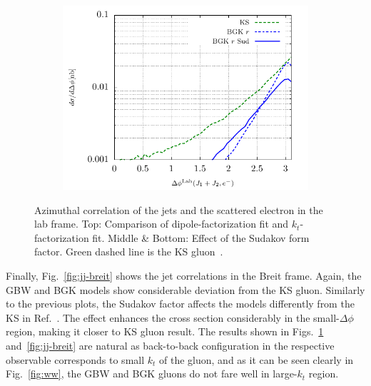 \documentclass[11pt]{article}
\numberwithin{equation}{section}
\numberwithin{table}{section}
\numberwithin{figure}{section}
\begin{document}
\begin{figure}[p]
\begin{subfigure}{0.5\textwidth}
		\includegraphics[width=\textwidth]{plots/plotBGK3Lab}
	\end{subfigure}
\caption{\footnotesize Azimuthal correlation of the jets and the scattered electron in the lab frame. Top: Comparison of dipole-factorization fit and $k_t$-factorization fit. Middle \& Bottom: Effect of the Sudakov form factor.  Green dashed line is the KS gluon~\cite{vanHameren:2021sqc}.}
\label{fig:je-lab}
\end{figure}

Finally, Fig.~\ref{fig:jj-breit} shows the jet correlations in the Breit frame. Again, the GBW and BGK models show considerable deviation from the KS gluon. Similarly to the previous plots, the Sudakov factor affects the models differently from the KS in Ref.~\cite{vanHameren:2021sqc}.
The effect enhances the cross section considerably in the small-$\Delta\phi$ region, making it closer to KS gluon result.
The results shown in Figs.~\ref{fig:je-lab} and~\ref{fig:jj-breit} are natural as back-to-back configuration in the respective observable corresponds to small $k_t$ of the gluon, and as it can be seen clearly in Fig.~\ref{fig:ww}, the GBW and BGK gluons do not fare well in large-$k_t$ region.  
\end{document}
